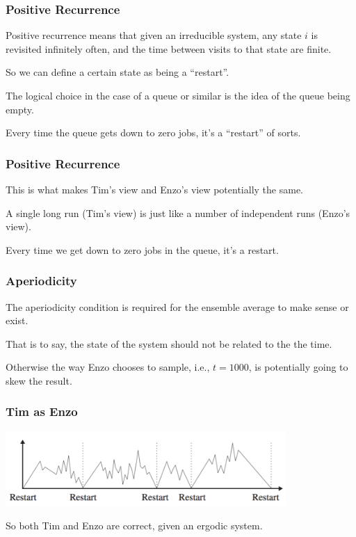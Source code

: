 \begin{frame}
\frametitle{Positive Recurrence}

\alert{Positive recurrence} means that given an irreducible system, any state $i$ is revisited infinitely often, and the time between visits to that state are finite. 

So we can define a certain state as being a ``restart''. 

The logical choice in the case of a queue or similar is the idea of the queue being empty. 

Every time the queue gets down to zero jobs, it's a ``restart'' of sorts. 

\end{frame}



\begin{frame}
\frametitle{Positive Recurrence}

This is what makes Tim's view and Enzo's view potentially the same. 

A single long run (Tim's view) is just like a number of independent runs (Enzo's view). 

Every time we get down to zero jobs in the queue, it's a restart. 

\end{frame}



\begin{frame}
\frametitle{Aperiodicity}

The \alert{aperiodicity} condition is required for the ensemble average to make sense or exist. 

That is to say, the state of the system should not be related to the the time.

Otherwise the way Enzo chooses to sample, i.e., $t = 1000$, is potentially going to skew the result.

\end{frame}



\begin{frame}
\frametitle{Tim as Enzo}

\begin{center}
	\includegraphics[width=0.8\textwidth]{images/systemrestart.png}
\end{center}

So both Tim and Enzo are correct, given an ergodic system.


\end{frame}



